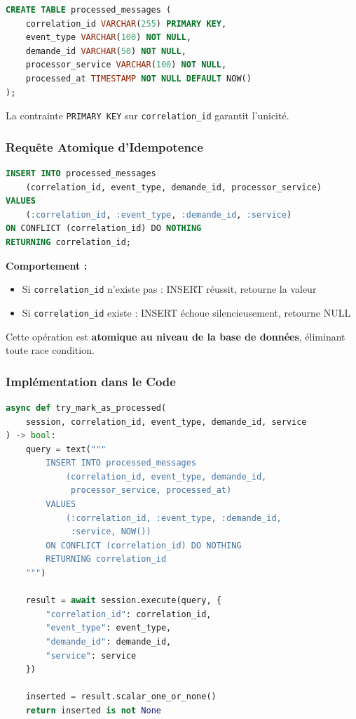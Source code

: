 \documentclass[12pt,a4paper]{article}
\begin{document}
\begin{lstlisting}[language=SQL]
CREATE TABLE processed_messages (
    correlation_id VARCHAR(255) PRIMARY KEY,
    event_type VARCHAR(100) NOT NULL,
    demande_id VARCHAR(50) NOT NULL,
    processor_service VARCHAR(100) NOT NULL,
    processed_at TIMESTAMP NOT NULL DEFAULT NOW()
);
\end{lstlisting}

La contrainte \texttt{PRIMARY KEY} sur \texttt{correlation\_id} garantit l'unicité.

\subsubsection{Requête Atomique d'Idempotence}

\begin{lstlisting}[language=SQL]
INSERT INTO processed_messages 
    (correlation_id, event_type, demande_id, processor_service)
VALUES 
    (:correlation_id, :event_type, :demande_id, :service)
ON CONFLICT (correlation_id) DO NOTHING
RETURNING correlation_id;
\end{lstlisting}

\textbf{Comportement :}

\begin{itemize}
    \item Si \texttt{correlation\_id} n'existe pas : INSERT réussit, retourne la valeur
    \item Si \texttt{correlation\_id} existe : INSERT échoue silencieusement, retourne NULL
\end{itemize}

Cette opération est \textbf{atomique au niveau de la base de données}, éliminant toute race condition.

\subsubsection{Implémentation dans le Code}

\begin{lstlisting}[language=Python]
async def try_mark_as_processed(
    session, correlation_id, event_type, demande_id, service
) -> bool:
    query = text("""
        INSERT INTO processed_messages 
            (correlation_id, event_type, demande_id, 
             processor_service, processed_at)
        VALUES 
            (:correlation_id, :event_type, :demande_id, 
             :service, NOW())
        ON CONFLICT (correlation_id) DO NOTHING
        RETURNING correlation_id
    """)
    
    result = await session.execute(query, {
        "correlation_id": correlation_id,
        "event_type": event_type,
        "demande_id": demande_id,
        "service": service
    })
    
    inserted = result.scalar_one_or_none()
    return inserted is not None
\end{lstlisting}
\end{document}
